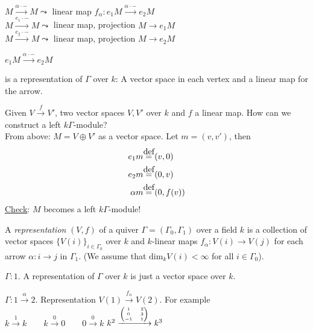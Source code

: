 \begin{exam}
\noindent \(M \xrightarrow{\alpha\cdot-} M \leadsto\) linear map
\(f_\alpha\colon e_1M\xrightarrow{\alpha\cdot-} e_2M\)\\
\(M\xrightarrow{e_1\cdot-}M\leadsto\) linear map, projection \(M\to e_1M\)\\
\(M\xrightarrow{e_2\cdot-}M\leadsto\) linear map, projection \(M\to e_2M\)\\

\begin{center}
\(e_1M \xrightarrow{\alpha\cdot -} e_2M\)
\end{center}
is a representation of \(\Gamma\) over \(k\): A vector space in each
vertex and a linear map for the arrow.
\end{exam}

Given $V\xrightarrow{f} V'$, two vector spaces $V,V'$ over \(k\) and
\(f\) a linear map. How can we construct a left \(k\Gamma\)-module?\\ 
From above: \(M = V\oplus V'\) as a vector space. Let \(m = (v, v')\), then\\
\begin{align}
e_1m & \defeq (v, 0)\notag\\
e_2m & \defeq (0, v)\notag\\
\alpha m & \defeq (0, f(v))\notag
\end{align}
\underline{Check}: \(M\) becomes a left \(k\Gamma\)-module!
\begin{defin}
  A \emph{representation} \((V, f)\) of a quiver
  \(\Gamma = (\Gamma_0, \Gamma_1)\) over a field \(k\) is a collection
  of vector spaces \(\{V(i)\}_{i\in\Gamma_0}\) over \(k\) and
  \(k\)-linear maps \(f_\alpha\colon V(i)\to  V(j)\) for each arrow
  \(\alpha\colon i\to  j\) in \(\Gamma_1\). (We assume that
  \(\text{dim}_kV(i) < \infty\) for all \(i\in\Gamma_0\)).
\end{defin}
\begin{exam}
 \(\Gamma\colon 1.\) A representation of \(\Gamma\) over \(k\) is just
 a vector space over \(k\).
\end{exam}
\begin{exam}
\(\Gamma\colon 1\xrightarrow{\alpha}2\). Representation \(V(1)\xrightarrow{f_\alpha}V(2)\). For example \\
    \(k\xrightarrow{1}k\quad\quad k\xrightarrow{0}0\quad\quad 0\xrightarrow{0}k\)\quad\quad
    \(k^2\xrightarrow{\tiny\begin{pmatrix} 1 & 2\\ 0 & 3 \\ -1 & 1 \end{pmatrix}}k^3\) \\
\end{exam}
